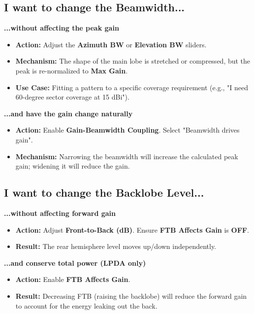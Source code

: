 \documentclass[11pt,a4paper]{article}
\begin{document}
\subsection{I want to change the Beamwidth...}

\textbf{...without affecting the peak gain}
\begin{itemize}
    \item \textbf{Action:} Adjust the \textbf{Azimuth BW} or \textbf{Elevation BW} sliders.
    \item \textbf{Mechanism:} The shape of the main lobe is stretched or compressed, but the peak is re-normalized to \textbf{Max Gain}.
    \item \textbf{Use Case:} Fitting a pattern to a specific coverage requirement (e.g., "I need 60-degree sector coverage at 15 dBi").
\end{itemize}

\textbf{...and have the gain change naturally}
\begin{itemize}
    \item \textbf{Action:} Enable \textbf{Gain-Beamwidth Coupling}. Select "Beamwidth drives gain".
    \item \textbf{Mechanism:} Narrowing the beamwidth will increase the calculated peak gain; widening it will reduce the gain.
\end{itemize}

\subsection{I want to change the Backlobe Level...}

\textbf{...without affecting forward gain}
\begin{itemize}
    \item \textbf{Action:} Adjust \textbf{Front-to-Back (dB)}. Ensure \textbf{FTB Affects Gain} is \textbf{OFF}.
    \item \textbf{Result:} The rear hemisphere level moves up/down independently.
\end{itemize}

\textbf{...and conserve total power (LPDA only)}
\begin{itemize}
    \item \textbf{Action:} Enable \textbf{FTB Affects Gain}.
    \item \textbf{Result:} Decreasing FTB (raising the backlobe) will reduce the forward gain to account for the energy leaking out the back.
\end{itemize}
\end{document}
